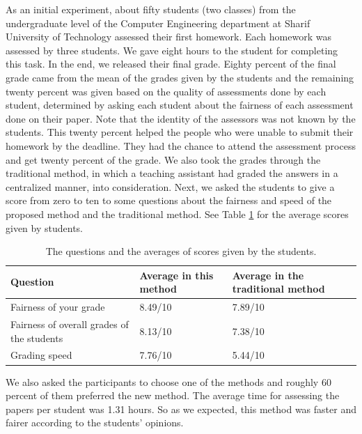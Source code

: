 \documentclass[manuscript,review,anonymous]{acmart}%
\begin{document}
As an initial experiment, about fifty students (two classes) from the undergraduate level of the Computer Engineering department at Sharif University of Technology assessed their first homework. Each homework was assessed by three students. We gave eight hours to the student for completing this task. In the end, we released their final grade. Eighty percent of the final grade came from the mean of the grades given by the students and
the remaining twenty percent was given based on the quality of assessments done by each student, determined by asking each student about the fairness of each assessment done on their paper. Note that the identity of the assessors was not known by the students.
This twenty percent helped the people who were unable to submit their homework by the deadline. They had the chance to attend the assessment process and get twenty percent of the grade.
We also took the grades through the traditional method, in which a teaching assistant had graded the answers in a centralized manner, into consideration.
Next, we asked the students to give a score from zero to ten to some questions about the fairness and speed of the proposed method and the traditional method. See Table \ref{t1} for the average scores given by students.


\begin{table}[h!]
\caption{The questions and the averages of scores given by the students.}
\begin{center}
\begin{tabular}{| l | ll |}
 \hline
 Question & Average in this method & Average in the traditional method\\ \hline
 Fairness of your grade& 8.49/10& 7.89/10 \\ \hline
 
 Fairness of overall grades of the students &8.13/10 &7.38/10 \\ \hline
 
 Grading speed & 7.76/10 & 5.44/10 \\ \hline
 
 
 
 \end{tabular}
\end{center}
\label{t1}
\end{table}



We also asked the participants to choose one of the methods and roughly 60 percent of them preferred the new method.
The average time for assessing the papers per student was 1.31 hours.
So as we expected, this method was faster and fairer according to the students' opinions.
\end{document}
